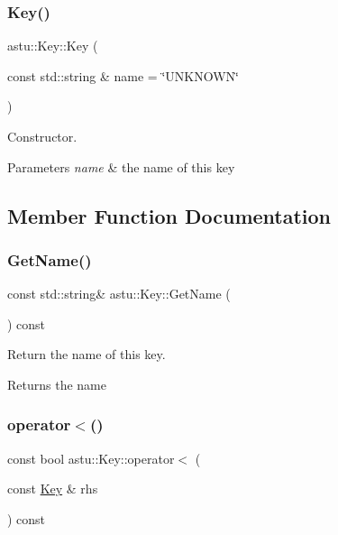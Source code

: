 \subsubsection{\texorpdfstring{Key()}{Key()}}
{\footnotesize\ttfamily astu\+::\+Key\+::\+Key (\begin{DoxyParamCaption}\item[{const std\+::string \&}]{name = {\ttfamily \char`\"{}UNKNOWN\char`\"{}} }\end{DoxyParamCaption})}

Constructor.


\begin{DoxyParams}{Parameters}
{\em name} & the name of this key \\
\hline
\end{DoxyParams}


\subsection{Member Function Documentation}
\mbox{\label{classastu_1_1Key_a15315633ef2aaec706ed6fce7fa6ef09}} 
\subsubsection{\texorpdfstring{Get\+Name()}{GetName()}}
{\footnotesize\ttfamily const std\+::string\& astu\+::\+Key\+::\+Get\+Name (\begin{DoxyParamCaption}{ }\end{DoxyParamCaption}) const}

Return the name of this key.

\begin{DoxyReturn}{Returns}
the name 
\end{DoxyReturn}
\mbox{\label{classastu_1_1Key_a6a139937577f2902bbff264741db0abb}} 
\subsubsection{\texorpdfstring{operator$<$()}{operator<()}}
{\footnotesize\ttfamily const bool astu\+::\+Key\+::operator$<$ (\begin{DoxyParamCaption}\item[{const \hyperlink{classastu_1_1Key}{Key} \&}]{rhs }\end{DoxyParamCaption}) const\hspace{0.3cm}{\ttfamily [inline]}}

